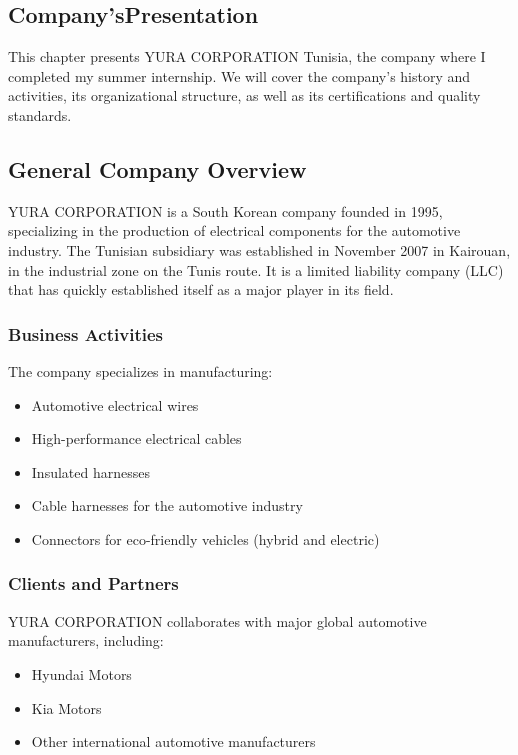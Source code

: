 \begin{center}
    \chapter{Company'sPresentation}
\end{center}
\label{chap:yura-presentation}

\noindent This chapter presents YURA CORPORATION Tunisia, the company where I completed my summer internship. We will cover the company's history and activities, its organizational structure, as well as its certifications and quality standards.

\section{General Company Overview}

YURA CORPORATION is a South Korean company founded in 1995, specializing in the production of electrical components for the automotive industry. The Tunisian subsidiary was established in November 2007 in Kairouan, in the industrial zone on the Tunis route. It is a limited liability company (LLC) that has quickly established itself as a major player in its field.

\subsection{Business Activities}

The company specializes in manufacturing:
\begin{itemize}
    \item Automotive electrical wires
    \item High-performance electrical cables
    \item Insulated harnesses
    \item Cable harnesses for the automotive industry
    \item Connectors for eco-friendly vehicles (hybrid and electric)
\end{itemize}

\subsection{Clients and Partners}

YURA CORPORATION collaborates with major global automotive manufacturers, including:
\begin{itemize}
    \item Hyundai Motors
    \item Kia Motors
    \item Other international automotive manufacturers
\end{itemize}

